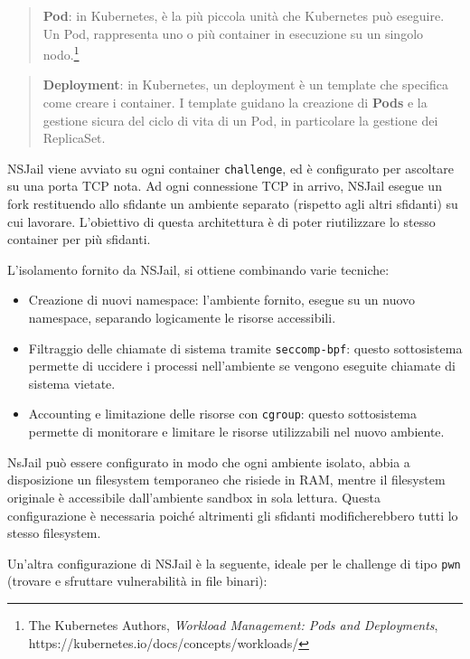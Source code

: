 \begin{quote}
\textbf{Pod}: in Kubernetes, è la più piccola unità che Kubernetes può
eseguire. Un Pod, rappresenta uno o più container in esecuzione su un
singolo nodo.\footnote{\label{fn:ref_5}The Kubernetes Authors, \emph{Workload
  Management: Pods and Deployments},
  https://kubernetes.io/docs/concepts/workloads/}
\end{quote}

\begin{quote}
\textbf{Deployment}: in Kubernetes, un deployment è un template che
specifica come creare i container. I template guidano la creazione di
\textbf{Pods} e la gestione sicura del ciclo di vita di un Pod, in
particolare la gestione dei ReplicaSet.
\end{quote}

NSJail viene avviato su ogni container
\passthrough{\lstinline!challenge!}, ed è configurato per ascoltare su
una porta TCP nota. Ad ogni connessione TCP in arrivo, NSJail esegue un
fork restituendo allo sfidante un ambiente separato (rispetto agli altri
sfidanti) su cui lavorare. L'obiettivo di questa architettura è di poter
riutilizzare lo stesso container per più sfidanti.

L'isolamento fornito da NSJail, si ottiene combinando varie tecniche:

\begin{itemize}
\tightlist
\item
  Creazione di nuovi namespace: l'ambiente fornito, esegue su un nuovo
  namespace, separando logicamente le risorse accessibili.
\item
  Filtraggio delle chiamate di sistema tramite
  \passthrough{\lstinline!seccomp-bpf!}: questo sottosistema permette di
  uccidere i processi nell'ambiente se vengono eseguite chiamate di
  sistema vietate.
\item
  Accounting e limitazione delle risorse con
  \passthrough{\lstinline!cgroup!}: questo sottosistema permette di
  monitorare e limitare le risorse utilizzabili nel nuovo ambiente.
\end{itemize}

NsJail può essere configurato in modo che ogni ambiente isolato, abbia a
disposizione un filesystem temporaneo che risiede in RAM, mentre il
filesystem originale è accessibile dall'ambiente sandbox in sola
lettura. Questa configurazione è necessaria poiché altrimenti gli
sfidanti modificherebbero tutti lo stesso filesystem.

Un'altra configurazione di NSJail è la seguente, ideale per le challenge
di tipo \passthrough{\lstinline!pwn!} (trovare e sfruttare vulnerabilità
in file binari):

